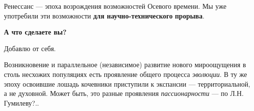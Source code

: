 \documentclass[a4paper]{article}
\begin{document}
\bigskip

{
Ренессанс — эпоха возрождения возможностей Осевого времени. Мы уже употребили эти возможности \textbf{для
научно-технического} \textbf{прорыва}. }


\bigskip

{\bfseries
А что сделаете вы?}


\bigskip

{
Добавлю от себя.}


\bigskip

{
Возникновение и параллельное (независимое) развитие нового мироощущения в столь несхожих популяциях есть проявление
общего процесса \textit{эволюции}. В ту же эпоху освоившие лошадь кочевники приступили к экспансии — территориальной, а
не духовной. Может быть, это разные проявления \textit{пассионарности} — по Л.Н. Гумилеву?.. }


\bigskip
\end{document}
